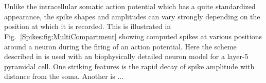 \section{}
\label{Spikes:sec:multi-compartment}
Unlike the intracellular somatic action potential which has a quite standardized appearance, the spike shapes and amplitudes can vary
strongly depending on the position at which it is recorded.  This is illustrated in Fig.~\ref{Spikes:fig:MultiCompartment} showing computed spikes at various 
positions around a neuron during the firing of an action potential. 
Here the scheme described in  is used with an biophysically detailed neuron model for a layer-5 pyramidal cell.
One striking features is the rapid decay of spike amplitude with distance from the soma. Another is ...


%
%


